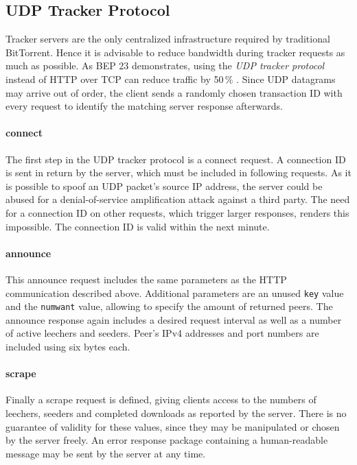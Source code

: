 \documentclass[10pt, a4paper, twoside, headsepline]{scrbook}
\renewcommand{\_}{\origunderscore\allowbreak}
\begin{document}
\subsection{UDP Tracker Protocol}
Tracker servers are the only centralized infrastructure required by traditional BitTorrent. Hence it is advisable to reduce bandwidth during tracker requests as much as possible. As BEP 23 demonstrates, using the \emph{UDP tracker protocol} instead of HTTP over TCP can reduce traffic by 50\,\% \cite{bep15}. Since UDP datagrams may arrive out of order, the client sends a randomly chosen transaction ID with every request to identify the matching server response afterwards.

\paragraph{connect}
The first step in the UDP tracker protocol is a connect request. A connection ID is sent in return by the server, which must be included in following requests. As it is possible to spoof an UDP packet's source IP address, the server could be abused for a denial-of-service amplification attack against a third party. The need for a connection ID on other requests, which trigger larger responses, renders this impossible. The connection ID is valid within the next minute.

\paragraph{announce}
This announce request includes the same parameters as the HTTP communication described above. Additional parameters are an unused \texttt{key} value and the \texttt{num\_want} value, allowing to specify the amount of returned peers. The announce response again includes a desired request interval as well as a number of active leechers and seeders. Peer's IPv4 addresses and port numbers are included using six bytes each.

\paragraph{scrape}
Finally a scrape request is defined, giving clients access to the numbers of leechers, seeders and completed downloads as reported by the server. There is no guarantee of validity for these values, since they may be manipulated or chosen by the server freely. An error response package containing a human-readable message may be sent by the server at any time.
\end{document}
